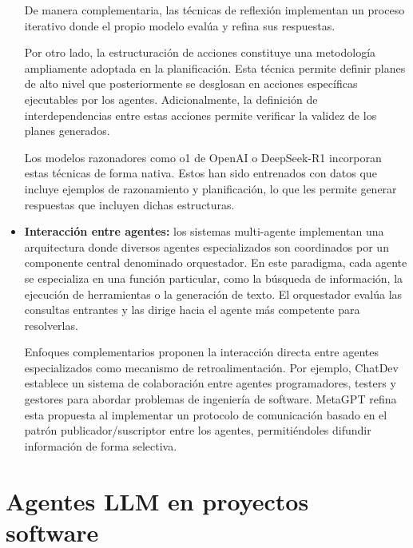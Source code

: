 \begin{itemize}
De manera complementaria, las técnicas de reflexión\cite{shinn_reflexion_nodate}\cite{madaan_self-refine_nodate}\cite{miao_selfcheck_2023} implementan un proceso iterativo donde el propio modelo evalúa y refina sus respuestas.

Por otro lado, la estructuración de acciones constituye una metodología ampliamente adoptada en la planificación\cite{lin_swiftsage_nodate}\cite{huang_language_nodate}\cite{wang_describe_2024}. Esta técnica permite definir planes de alto nivel que posteriormente se desglosan en acciones específicas ejecutables por los agentes\cite{zhu_ghost_2023}\cite{song_llm-planner_2023}\cite{wang_voyager_2023}\cite{liu_odyssey_2024}. Adicionalmente, la definición de interdependencias entre estas acciones permite verificar la validez de los planes generados\cite{raman_planning_nodate}\cite{liu_llmp_2023}\cite{dagan_dynamic_2023}.

Los modelos razonadores como o1 de OpenAI o DeepSeek-R1 incorporan estas técnicas de forma nativa\cite{noauthor_deepseek-r1deepseek_r1pdf_nodate}. Estos han sido entrenados con datos que incluye ejemplos de razonamiento y planificación, lo que les permite generar respuestas que incluyen dichas estructuras.


\item{\textbf{Interacción entre agentes: }}los sistemas multi-agente implementan una arquitectura donde diversos agentes especializados son coordinados por un componente central denominado orquestador\cite{karpas_mrkl_2022}\cite{ge_openagi_nodate}. En este paradigma, cada agente se especializa en una función particular, como la búsqueda de información, la ejecución de herramientas o la generación de texto. El orquestador evalúa las consultas entrantes y las dirige hacia el agente más competente para resolverlas.

Enfoques complementarios proponen la interacción directa entre agentes especializados como mecanismo de retroalimentación\cite{zhuge_mindstorms_2023}\cite{du_improving_nodate}. Por ejemplo, ChatDev\cite{qian_chatdev_2024} establece un sistema de colaboración entre agentes programadores, testers y gestores para abordar problemas de ingeniería de software. MetaGPT\cite{hong_metagpt_2024} refina esta propuesta al implementar un protocolo de comunicación basado en el patrón publicador/suscriptor entre los agentes, permitiéndoles difundir información de forma selectiva. 
\end{itemize}


\section{Agentes LLM en proyectos software}

